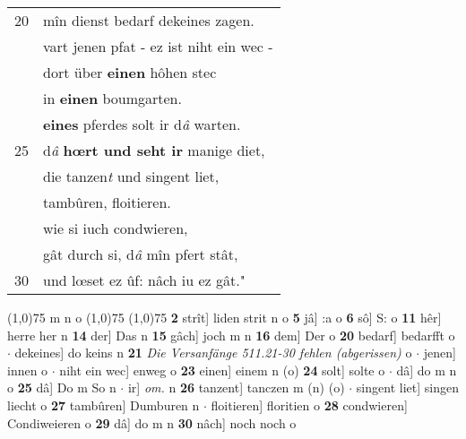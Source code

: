 \documentclass[8pt,a4paper,notitlepage]{article}
\begin{document}
\begin{table}[ht]
\begin{minipage}[t]{0.5\linewidth}
\begin{tabular}{rl}
20 & mîn dienst bedarf dekeines zagen.\\ 
 & vart jenen pfat - ez ist niht ein wec -\\ 
 & dort über \textbf{einen} hôhen stec\\ 
 & in \textbf{einen} boumgarten.\\ 
 & \textbf{eines} pferdes solt ir d\textit{â} warten.\\ 
25 & d\textit{â} \textbf{hœrt und seht ir} manige diet,\\ 
 & die tanzen\textit{t} und singent liet,\\ 
 & tambûren, floitieren.\\ 
 & wie si iuch condwieren,\\ 
 & gât durch si, d\textit{â} mîn pfert stât,\\ 
30 & und lœset ez ûf: nâch iu ez gât."\\ 
\end{tabular}
\scriptsize
\line(1,0){75} \newline
m n o \newline
\line(1,0){75} \newline
\newline
\line(1,0){75} \newline
\textbf{2} strît] liden strit n o \textbf{5} jâ] :a o \textbf{6} sô] S: o \textbf{11} hêr] herre her n \textbf{14} der] Das n \textbf{15} gâch] joch m n \textbf{16} dem] Der o \textbf{20} bedarf] bedarfft o  $\cdot$ dekeines] do keins n \textbf{21} \textit{Die Versanfänge 511.21-30 fehlen (abgerissen)} o   $\cdot$ jenen] innen o  $\cdot$ niht ein wec] enweg o \textbf{23} einen] einem n (o) \textbf{24} solt] solte o  $\cdot$ dâ] do m n o \textbf{25} dâ] Do m So n  $\cdot$ ir] \textit{om.} n \textbf{26} tanzent] tanczen m (n) (o)  $\cdot$ singent liet] singen liecht o \textbf{27} tambûren] Dumburen n  $\cdot$ floitieren] floritien o \textbf{28} condwieren] Condiweieren o \textbf{29} dâ] do m n \textbf{30} nâch] noch noch o \newline
\end{minipage}
\end{table}
\newpage
\end{document}
